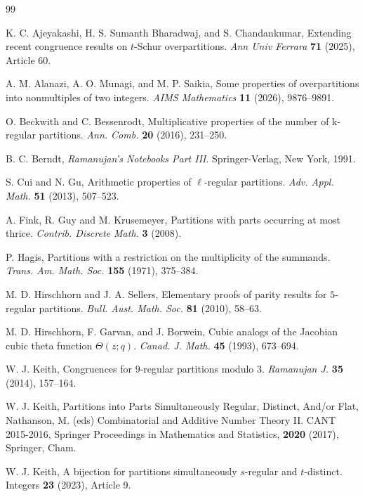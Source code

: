 \documentclass[12pt]{amsart}
\theoremstyle{plain}
\theoremstyle{definition}
\begin{document}
\footnotesize
\begin{thebibliography}{99}
\setlength{\baselineskip}{.45cm}

 K. C. Ajeyakashi, H. S. Sumanth Bharadwaj, and S. Chandankumar, Extending recent congruence results on $t$-Schur overpartitions. \textit{Ann Univ Ferrara} \textbf{71} (2025), Article 60.

 A. M. Alanazi, A. O. Munagi, and M. P. Saikia, Some properties of overpartitions into nonmultiples of two integers. \textit{AIMS Mathematics} \textbf{11} (2026), 9876--9891. 

 O. Beckwith and C. Bessenrodt, Multiplicative properties of the number of k-regular partitions. \textit{Ann. Comb.} \textbf{20} (2016), 231--250.

 B. C. Berndt, {\it Ramanujan's Notebooks Part III}. Springer-Verlag, New York,  1991.

 S. Cui and N. Gu, Arithmetic properties of $\ell$-regular partitions. \textit{Adv. Appl. Math.} {\bf 51} (2013), 507--523.

 A. Fink, R. Guy and M. Krusemeyer, Partitions with parts occurring at most thrice. \textit{Contrib. Discrete Math.} {\bf 3} (2008).

 P. Hagis, Partitions with a restriction on the multiplicity of the summands. \textit{Trans. Am. Math. Soc.} {\bf 155} (1971), 375--384.

 M. D. Hirschhorn and J. A. Sellers, Elementary proofs of parity results for $5$-regular partitions. \textit{Bull. Aust. Math. Soc.} {\bf 81} (2010), 58--63.

 M. D. Hirschhorn, F. Garvan, and J. Borwein, Cubic analogs of the Jacobian cubic theta function $\Theta(z;q)$. \textit{Canad. J. Math.} \textbf{45} (1993), 673--694.

 W. J. Keith, Congruences for $9$-regular partitions modulo $3$. \textit{Ramanujan J.} {\bf 35} (2014), 157--164.

 W. J. Keith, Partitions into Parts Simultaneously Regular, Distinct, And/or Flat, Nathanson, M. (eds) Combinatorial and Additive Number Theory II. CANT 2015-2016, Springer Proceedings in Mathematics and Statistics, {\bf 2020} (2017), Springer, Cham.

 W. J. Keith, A bijection for partitions simultaneously $s$-regular and $t$-distinct. Integers \textbf{23} (2023), Article 9.


\end{thebibliography}
\end{document}
